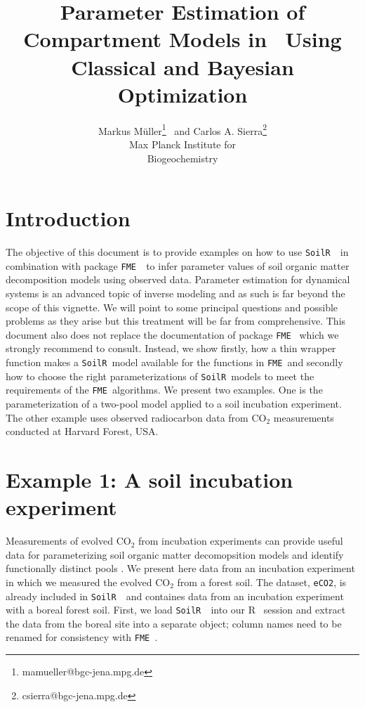 \documentclass[a4paper]{article}\usepackage[]{graphicx}\usepackage[]{color}
\title{Parameter Estimation of Compartment Models in \SoilR \, Using Classical and Bayesian Optimization}
\author{Markus M\"uller\thanks{mamueller@bgc-jena.mpg.de} \ 
     and Carlos A. Sierra\thanks{csierra@bgc-jena.mpg.de} \\ 
         Max Planck Institute for \\
         Biogeochemistry }
\newcommand{\R}{\textsf{R }}
\newcommand{\SoilR}{\texttt{SoilR }}
\newcommand{\FME}{\texttt{FME }}
\begin{document}
\maketitle










\section{Introduction}
The objective of this document is to provide examples on how to use \SoilR \, in combination with package \FME \,
to infer parameter values of soil organic matter decomposition models using observed data. 
Parameter estimation for dynamical systems is an advanced topic of inverse modeling and as such is far beyond  the scope of this vignette. We will point to some principal questions and possible problems as they arise but this treatment will be far from comprehensive. 
This document also does not replace  the documentation of package \FME \citep{Soetaert} which we strongly recommend to consult.
Instead, we show firstly, how a thin wrapper function makes a \SoilR model available for the functions in  \FME and secondly how to choose the right parameterizations of \SoilR models to meet the requirements of the \FME algorithms.
We present two examples. One is the parameterization of a two-pool model applied to a soil incubation experiment. The other example uses observed radiocarbon data from CO$_2$ measurements conducted at Harvard Forest, USA. 

\section{Example 1: A soil incubation experiment}
Measurements of evolved CO$_2$ from incubation experiments can provide useful data for parameterizing soil organic matter decomopsition models and identify functionally distinct pools \citep{Schadel}. We present here data from an incubation experiment in which we measured the evolved CO$_2$ from a forest soil. The dataset, {\tt eCO2}, is already included in \SoilR \, and containes data from an incubation experiment with a boreal forest soil. First, we load \SoilR \, into our \R \, session and extract the data from the boreal site into a separate object; column names need to be renamed for consistency with \FME.
\end{document}
